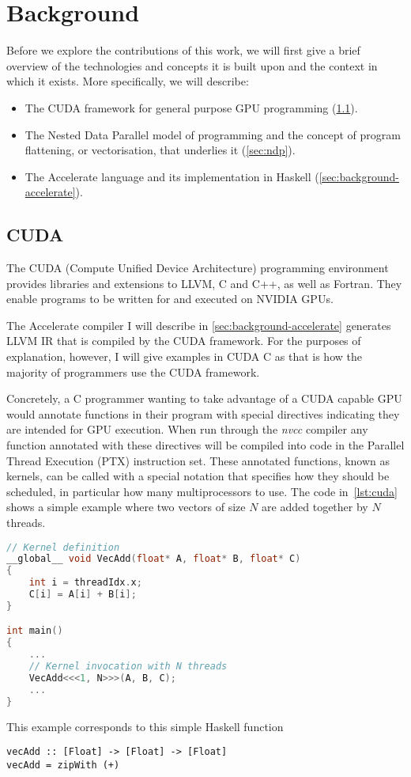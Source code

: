 \chapter{Background}
\label{chap:background}

Before we explore the contributions of this work, we will first give a brief overview of the technologies and concepts it is built upon and the context in which it exists. More specifically, we will describe:

\begin{itemize}
  \item The CUDA framework for general purpose GPU programming (\ref{sec:cuda}).
  \item The Nested Data Parallel model of programming and the concept of program flattening, or vectorisation, that underlies it (\ref{sec:ndp}).
  \item The Accelerate language and its implementation in Haskell (\ref{sec:background-accelerate}).
\end{itemize}

\section{CUDA}
\label{sec:cuda}

The CUDA (Compute Unified Device Architecture)\cite{cuda} programming environment provides libraries and extensions to LLVM, C and C++, as well as Fortran. They enable programs to be written for and executed on NVIDIA GPUs.

The Accelerate compiler I will describe in \ref{sec:background-accelerate} generates LLVM IR that is compiled by the CUDA framework. For the purposes of explanation, however, I will give examples in CUDA C as that is how the majority of programmers use the CUDA framework.

Concretely, a C programmer wanting to take advantage of a CUDA capable GPU would annotate functions in their program with special directives indicating they are intended for GPU execution. When run through the \emph{nvcc} compiler any function annotated with these directives will be compiled into code in the Parallel Thread Execution (PTX) instruction set. These annotated functions, known as kernels, can be called with a special notation that specifies how they should be scheduled, in particular how many multiprocessors to use. The code in~\ref{lst:cuda} shows a simple example where two vectors of size $N$ are added together by $N$ threads.
%
\begin{lstlisting}[language=C, label=lst:cuda, caption={Adding two $N$ length vectors in CUDA C\citep{cuda}}]
// Kernel definition
__global__ void VecAdd(float* A, float* B, float* C)
{
    int i = threadIdx.x;
    C[i] = A[i] + B[i];
}

int main()
{
    ...
    // Kernel invocation with N threads
    VecAdd<<<1, N>>>(A, B, C);
    ...
}
\end{lstlisting}
%
This example corresponds to this simple Haskell function
%
\begin{lstlisting}
vecAdd :: [Float] -> [Float] -> [Float]
vecAdd = zipWith (+)
\end{lstlisting}

